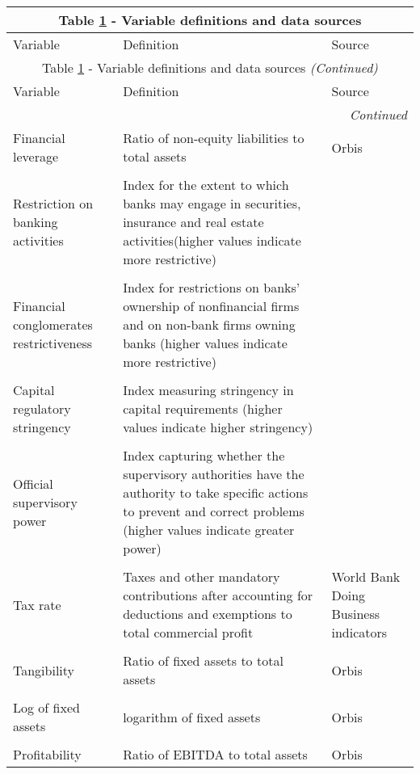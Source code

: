 	\centering
		\begin{longtable}{p{2.5in}p{4in}p{2in}}
				\label{tab:definition}\\
			\multicolumn{3}{c}{Table \ref{tab:definition} - Variable definitions and data sources}\\
			\hline 
			Variable      & Definition & Source \\
			\hline \endfirsthead
			
				\multicolumn{3}{c}{Table \ref{tab:definition} - Variable definitions and data sources \textit{(Continued)}}\\
			\hline 
			Variable      & Definition & Source \\
			\hline \endhead
			
			\hline
			\multicolumn{3}{r}{{\textit{Continued}}}\\ 
			\endfoot
			\hline
			\endlastfoot
			Financial leverage      & Ratio of non-equity liabilities to total assets & Orbis \\
		&&\\
		Restriction on banking activities & Index for the extent to which banks may engage in securities, insurance and real estate activities(higher values indicate more restrictive) & \cite{barth2013bank}\\
			&&\\
			Financial conglomerates restrictiveness & Index for restrictions on banks' ownership of nonfinancial firms and on non-bank firms owning banks (higher values indicate more restrictive) & \cite{barth2013bank}\\	
			&&\\
			Capital regulatory stringency & Index measuring stringency in capital requirements (higher values indicate higher stringency) & \cite{barth2013bank}\\
			&&\\
			Official supervisory power & Index capturing whether the supervisory authorities have the authority to take specific actions to prevent and correct problems (higher values indicate greater power) & \cite{barth2013bank}\\		
			&&\\	
			Tax rate & Taxes and other mandatory contributions after accounting  for deductions and exemptions to total commercial profit & World Bank Doing Business indicators\\
			&&\\
			Tangibility& Ratio of fixed assets to total assets & Orbis\\
			&&\\
			Log of fixed assets& logarithm of fixed assets & Orbis\\
			&&\\
			Profitability& Ratio of EBITDA to total assets & Orbis\\
		
		\end{longtable}%
